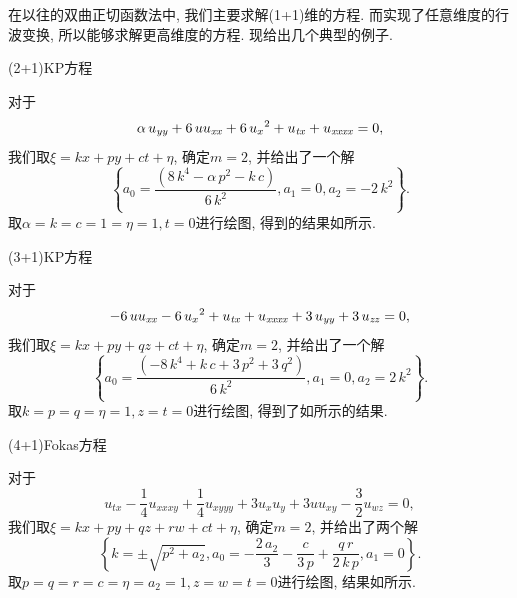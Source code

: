在以往的双曲正切函数法中, 我们主要求解(1+1)维的方程. 而实现了任意维度的行波变换, 所以能够求解更高维度的方程. 现给出几个典型的例子.

\begin{example}(2+1)KP方程\CITEbaKP{}

对于
\begin{equation}
    \alpha\,u_{{{\it yy}}}+6\,uu_{{{\it xx}}}+6\,{u_{{x}}}^{2}+u_{{{\it tx}}}+u_{{{\it xxxx}}}=0,
\end{equation}
我们取$\xi=kx+py+ct+\eta$, 确定$m=2$, 并给出了一个解
\begin{equation}
    \left\{ {{a}_{0}}=\frac{\left( 8\,{k}^{4}-\alpha\,{p}^{2}-k\,c\right) }{6\,{k}^{2}},{{a}_{1}}=0,{{a}_{2}}=-2\,{k}^{2}\right\} .
\end{equation}
取$\alpha=k=c=1=\eta=1,t=0$进行绘图, 得到的结果如所示.
\end{example}

\begin{example}(3+1)KP方程\CITEcaKP{}

对于
\begin{equation}
    -6\,uu_{{{\it xx}}}-6\,{u_{{x}}}^{2}+u_{{{\it tx}}}+u_{{{\it xxxx}}}+3\,u_{{{\it yy}}}+3\,u_{{{\it zz}}}=0,
\end{equation}
我们取$\xi=kx+py+qz+ct+\eta$, 确定$m=2$, 并给出了一个解
\begin{equation}
    \left\{ {{a}_{0}}=\frac{\left( -8\,{k}^{4}+k\,c+3\,{p}^{2}+3\,{q}^{2}\right) }{6\,{k}^{2}},{{a}_{1}}=0,{{a}_{2}}=2\,{k}^{2}\right\} .
\end{equation}
取$k=p=q=\eta=1,z=t=0$进行绘图, 得到了如所示的结果. 
\end{example}

\begin{example}(4+1)Fokas方程\CITEdaFokas{}

对于
\begin{equation}
    u_{tx}-\frac{1}{4}u_{xxxy}+\frac{1}{4}u_{xyyy}+3u_xu_y+3uu_{xy}-\frac{3}{2}u_{wz}=0 ,
\end{equation}
我们取$\xi=kx+py+qz+rw+ct+\eta$, 确定$m=2$, 并给出了两个解
\begin{equation}
    \left\{ k=\pm \sqrt {{p}^{2}+{{a}_{2}}},{{a}_{0}}=-\frac{2\,{{a}_{2}}}{3}-\frac{c}{3\,p}+ \frac{q\,r}{2\,k\,p},{{a}_{1}}=0\right\} .
\end{equation}
取$p=q=r=c=\eta=a_2=1,z=w=t=0$进行绘图, 结果如所示. 
\end{example}

